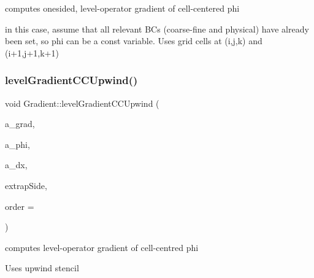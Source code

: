 computes onesided, level-\/operator gradient of cell-\/centered phi 

in this case, assume that all relevant BC\textquotesingle{}s (coarse-\/fine and physical) have already been set, so phi can be a const variable. Uses grid cells at (i,j,k) and (i+1,j+1,k+1) \mbox{\label{class_gradient_ab55b4c85431294e40707bd0bdae6e012}} 
\subsubsection{\texorpdfstring{level\+Gradient\+C\+C\+Upwind()}{levelGradientCCUpwind()}\hspace{0.1cm}{\footnotesize\ttfamily [2/2]}}
{\footnotesize\ttfamily void Gradient\+::level\+Gradient\+C\+C\+Upwind (\begin{DoxyParamCaption}\item[{\textbf{ Level\+Data}$<$ \textbf{ F\+Array\+Box} $>$ \&}]{a\+\_\+grad,  }\item[{const \textbf{ Level\+Data}$<$ \textbf{ F\+Array\+Box} $>$ \&}]{a\+\_\+phi,  }\item[{const \textbf{ Real}}]{a\+\_\+dx,  }\item[{const \textbf{ Side\+::\+Lo\+Hi\+Side}}]{extrap\+Side,  }\item[{int}]{order = {} }\end{DoxyParamCaption})\hspace{0.3cm}{\ttfamily [static]}}



computes level-\/operator gradient of cell-\/centred phi 

Uses upwind stencil \mbox{\label{class_gradient_a7d6a189f7e14c864e35ef507128c9113}} 
